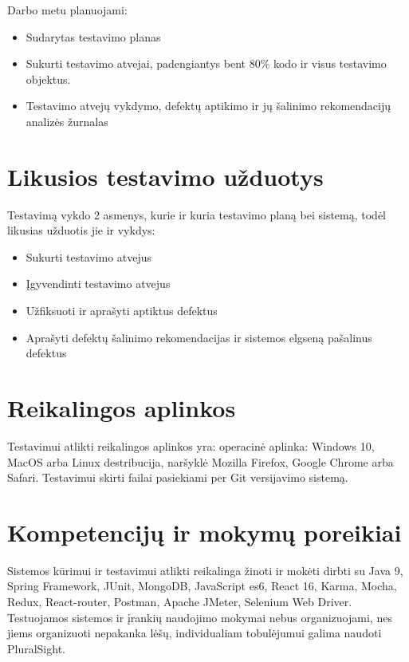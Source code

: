 \documentclass{VUMIFPSkursinis}
\begin{document}
    Darbo metu planuojami: 

    \begin{itemize}
    	\item Sudarytas testavimo planas
    	\item Sukurti testavimo atvejai, padengiantys bent 80\% kodo ir visus testavimo objektus.
    	\item Testavimo atvejų vykdymo, defektų aptikimo ir jų šalinimo rekomendacijų analizės žurnalas
    \end{itemize}

    \section{Likusios testavimo užduotys}

    Testavimą vykdo 2 asmenys, kurie ir kuria testavimo planą bei sistemą, todėl likusias užduotis jie ir vykdys:

    \begin{itemize}
    	\item Sukurti testavimo atvejus
    	\item Įgyvendinti testavimo atvejus
    	\item Užfiksuoti ir aprašyti aptiktus defektus
    	\item Aprašyti defektų šalinimo rekomendacijas ir sistemos elgseną pašalinus defektus
    \end{itemize}

    \section{Reikalingos aplinkos}

    Testavimui atlikti reikalingos aplinkos yra: operacinė aplinka: Windows 10, MacOS arba Linux destribucija, naršyklė Mozilla Firefox, Google Chrome arba Safari. 
    Testavimui skirti failai pasiekiami per Git versijavimo sistemą. 

    \section{Kompetencijų ir mokymų poreikiai}

    Sistemos kūrimui ir testavimui atlikti reikalinga žinoti ir mokėti dirbti su Java 9, Spring Framework, JUnit,
     MongoDB, JavaScript es6, React 16, Karma, Mocha, Redux, React-router, Postman, Apache JMeter, Selenium Web Driver. 
    Testuojamos sistemos ir įrankių naudojimo mokymai nebus organizuojami, nes jiems organizuoti nepakanka lėšų, individualiam tobulėjumui galima naudoti PluralSight.
\end{document}
